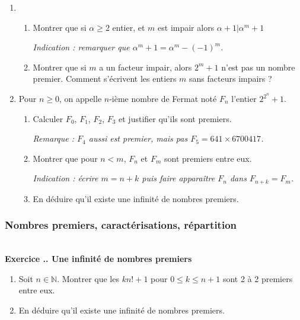 \documentclass{article}
\newcommand{\mb}[1]{\mathbb{#1}}
\newcounter{exo}
\newcommand{\exercice}[1][\null]{\textbf{\\ Exercice \thesection.\theexo. #1} \addtocounter{exo}{1}}
\begin{document}
\begin{enumerate}

\item \begin{enumerate}

\item Montrer que si $\alpha \ge 2$ entier, et $m$ est impair alors $\alpha +1 | \alpha^m +1$

\emph{Indication : remarquer que $\alpha^m +1 = \alpha^m - (-1)^m$.}

\item Montrer que si $m$ a un facteur impair, alors $2^m+1$ n'est pas un nombre premier. Comment s'écrivent  les entiers $m$ sans facteurs impairs ?

\end{enumerate}

\item Pour $n \ge 0$, on appelle $n$-ième nombre de Fermat noté $F_n$ l'entier $2^{2^n}+1$.

\begin{enumerate}

\item Calculer $F_0$, $F_1$, $F_2$, $F_3$ et justifier qu'ils sont premiers.

\emph{Remarque : $F_4$ aussi est premier, mais pas $F_5 = 641 \times 6700417$.}

\item Montrer que pour $n < m$, $F_n$ et $F_m$ sont premiers entre eux.

\emph{Indication : écrire $m = n+k$ puis faire apparaître $F_n$ dans $F_{n+k} = F_m$.}

\item En déduire qu'il existe une infinité de nombres premiers.

\end{enumerate}



\end{enumerate}



\subsubsection{Nombres premiers, caractérisations, répartition}


\exercice[Une infinité de nombres premiers]

\begin{enumerate}

\item Soit $n \in \mb{N}$. Montrer que les $ k n! +1$ pour $0 \le k \le n+1$ sont 2 à 2 premiers entre eux.

\item En déduire qu'il existe une infinité de nombres premiers.

\end{enumerate}
\end{document}
